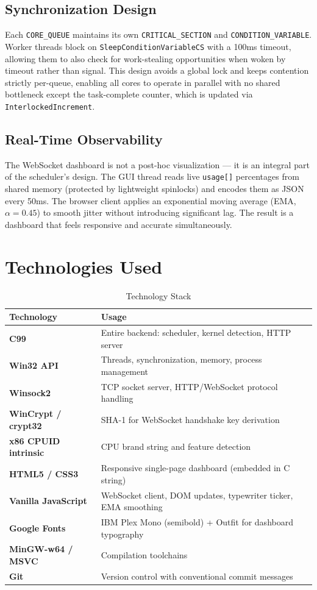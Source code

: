 \documentclass[12pt,a4paper]{article}
\begin{document}
\subsection{Synchronization Design}

Each \texttt{CORE\_QUEUE} maintains its own \texttt{CRITICAL\_SECTION} and \texttt{CONDITION\_VARIABLE}. Worker threads block on \texttt{SleepConditionVariableCS} with a 100ms timeout, allowing them to also check for work-stealing opportunities when woken by timeout rather than signal. This design avoids a global lock and keeps contention strictly per-queue, enabling all cores to operate in parallel with no shared bottleneck except the task-complete counter, which is updated via \texttt{InterlockedIncrement}.

\subsection{Real-Time Observability}

The WebSocket dashboard is not a post-hoc visualization --- it is an integral part of the scheduler's design. The GUI thread reads live \texttt{usage[]} percentages from shared memory (protected by lightweight spinlocks) and encodes them as JSON every 50ms. The browser client applies an exponential moving average (EMA, $\alpha = 0.45$) to smooth jitter without introducing significant lag. The result is a dashboard that feels responsive and accurate simultaneously.


\section{Technologies Used}

\begin{table}[H]
\centering
\begin{tabular}{>{\bfseries}p{4cm} p{9cm}}
\toprule
Technology & Usage \\
\midrule
C99 & Entire backend: scheduler, kernel detection, HTTP server \\
Win32 API & Threads, synchronization, memory, process management \\
Winsock2 & TCP socket server, HTTP/WebSocket protocol handling \\
WinCrypt / crypt32 & SHA-1 for WebSocket handshake key derivation \\
x86 CPUID intrinsic & CPU brand string and feature detection \\
HTML5 / CSS3 & Responsive single-page dashboard (embedded in C string) \\
Vanilla JavaScript & WebSocket client, DOM updates, typewriter ticker, EMA smoothing \\
Google Fonts & IBM Plex Mono (semibold) + Outfit for dashboard typography \\
MinGW-w64 / MSVC & Compilation toolchains \\
Git & Version control with conventional commit messages \\
\bottomrule
\end{tabular}
\caption{Technology Stack}
\end{table}
\end{document}
